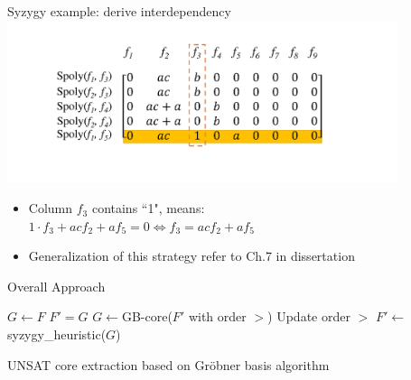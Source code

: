 \documentclass[xcolor=dvipsnames]{beamer}
\newcommand{\bi}{\begin{itemize}}
\newcommand{\ei}{\end{itemize}}
\begin{document}
\begin{frame}{\large{Syzygy example: derive interdependency}}
\includegraphics[width=4.5in]{./syzygy_4.pdf}
\bi
\item Column $f_3$ contains ``1", means:\\
$1\cdot f_3 + ac f_2 + a f_5 = 0\Leftrightarrow f_3 = acf_2+af_5$
\item Generalization of this strategy refer to Ch.7 in dissertation
\ei
\end{frame}
\begin{frame}{\large{Overall Approach}}
\begin{algorithm}[H] %
\SetAlgoNoLine
 $G \gets F$\;
  {
	$F' = G$\;
  	$G \gets $GB-core($F'$ with order $>$)\;
	Update order $>$\;
  }
  $F'\gets$syzygy\_heuristic($G$)\;
\caption {UNSAT core extraction based on Gr\"obner basis algorithm}
\end{algorithm}
\end{frame}
\end{document}
